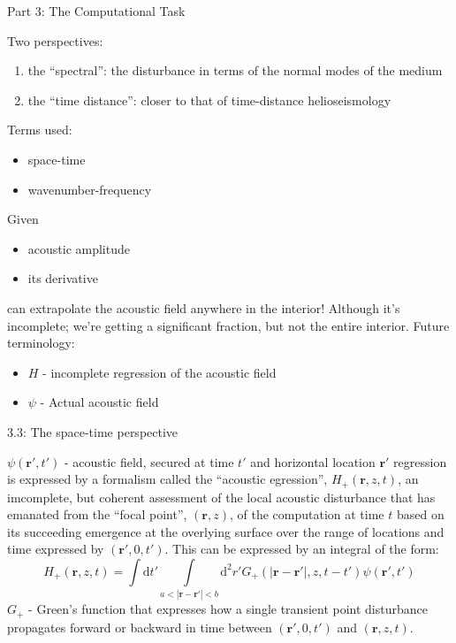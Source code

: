 \documentclass{beamer}
\begin{document}
\begin{frame}{Part 3: The Computational Task}
\end{frame}

\begin{frame}{3.1}
    Two perspectives:
    \begin{enumerate}
        \item the ``spectral'': the disturbance in terms of the normal
            modes of the medium
        \item the ``time distance'': closer to that of time-distance
            helioseismology
    \end{enumerate}
    Terms used:
    \begin{itemize}
        \item space-time
        \item wavenumber-frequency
    \end{itemize}
\end{frame}

\begin{frame}{3.2}
    Given
    \begin{itemize}
        \item acoustic amplitude
        \item its derivative
    \end{itemize}
    can extrapolate the acoustic field anywhere in the interior!
    Although it's incomplete; we're getting a significant fraction, but not
    the entire interior. Future terminology:
    \begin{itemize}
        \item $H$ - incomplete regression of the acoustic field
        \item $\psi$ - Actual acoustic field
    \end{itemize}
\end{frame}

\begin{frame}{3.3: The space-time perspective}

    $\psi(\mathbf{r}',t')$ - acoustic field, secured at time
    $t'$ and horizontal location $\mathbf{r}'$
    regression is expressed by a formalism called the ``acoustic egression'',
    $H_{+}(\mathbf{r},z,t)$, an imcomplete, but coherent assessment of the local
    acoustic disturbance that has emanated from the ``focal point'',
    $(\mathbf{r},z)$, of the computation at time $t$ based on its succeeding
    emergence at the overlying surface over the range of locations and time
    expressed by $(\mathbf{r}',0,t')$. This can be expressed by an integral
    of the form:
    $$ H_{+}(\mathbf{r},z,t) = \int
    \textrm{d}t' \int\limits_{a<|\mathbf{r}-\mathbf{r}'|<b}
    \textrm{d}^{2}r'G_{+}
    (|\mathbf{r}-\mathbf{r}'|,z,t-t')\psi(\mathbf{r}',t')  $$
    $G_{+}$ - Green's function that expresses how a single transient point
    disturbance propagates forward or backward in time between
    $(\mathbf{r}',0,t')$ and $(\mathbf{r},z,t)$.
\end{frame}
\end{document}
